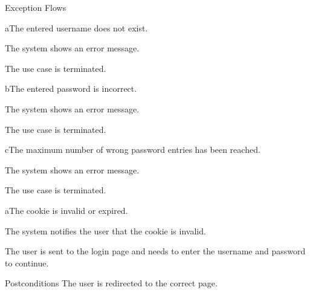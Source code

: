 \begin{cpartList}{Exception Flows}
  \begin{innerList}{2}{a}{The entered username does not exist.}
    \item The system shows an error message.
    \item The use case is terminated.
  \end{innerList}
  \begin{innerList}{2}{b}{The entered password is incorrect.}
    \item The system shows an error message.
    \item The use case is terminated.
  \end{innerList}
  \begin{innerList}{2}{c}{The maximum number of wrong password entries has been reached.}
    \item The system shows an error message.
    \item The use case is terminated.
  \end{innerList}
  \begin{innerList}{4}{a}{The cookie is invalid or expired.}
    \item The system notifies the user that the cookie is invalid.
    \item The user is sent to the login page and needs to enter the username and password to continue.
  \end{innerList}
\end{cpartList}

\begin{cpart}{Postconditions}
The user is redirected to the correct page.
\end{cpart}

